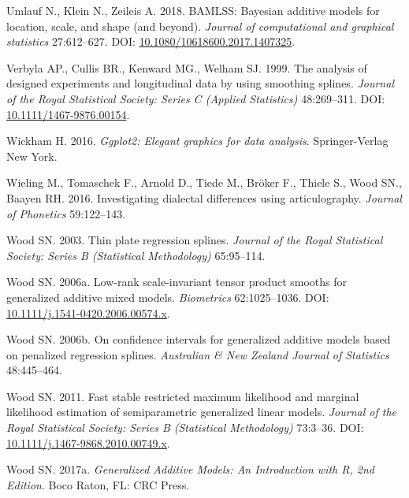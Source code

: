 \documentclass[12pt]{article}
\begin{document}
\hypertarget{ref-umlauf_bamlss_2018}{}
Umlauf N., Klein N., Zeileis A. 2018. BAMLSS: Bayesian additive models
for location, scale, and shape (and beyond). \emph{Journal of
computational and graphical statistics} 27:612--627. DOI:
\href{https://doi.org/10.1080/10618600.2017.1407325}{10.1080/10618600.2017.1407325}.

\hypertarget{ref-verbyla_analysis_2002}{}
Verbyla AP., Cullis BR., Kenward MG., Welham SJ. 1999. The analysis of
designed experiments and longitudinal data by using smoothing splines.
\emph{Journal of the Royal Statistical Society: Series C (Applied
Statistics)} 48:269--311. DOI:
\href{https://doi.org/10.1111/1467-9876.00154}{10.1111/1467-9876.00154}.

\hypertarget{ref-wickham_ggplot2_2016}{}
Wickham H. 2016. \emph{Ggplot2: Elegant graphics for data analysis}.
Springer-Verlag New York.

\hypertarget{ref-wieling_investigating_2016}{}
Wieling M., Tomaschek F., Arnold D., Tiede M., Bröker F., Thiele S.,
Wood SN., Baayen RH. 2016. Investigating dialectal differences using
articulography. \emph{Journal of Phonetics} 59:122--143.

\hypertarget{ref-wood_thin_2003}{}
Wood SN. 2003. Thin plate regression splines. \emph{Journal of the Royal
Statistical Society: Series B (Statistical Methodology)} 65:95--114.

\hypertarget{ref-wood_lowrank_2006}{}
Wood SN. 2006a. Low-rank scale-invariant tensor product smooths for
generalized additive mixed models. \emph{Biometrics} 62:1025--1036. DOI:
\href{https://doi.org/10.1111/j.1541-0420.2006.00574.x}{10.1111/j.1541-0420.2006.00574.x}.

\hypertarget{ref-wood_confidence_2006}{}
Wood SN. 2006b. On confidence intervals for generalized additive models
based on penalized regression splines. \emph{Australian \& New Zealand
Journal of Statistics} 48:445--464.

\hypertarget{ref-wood_fast_2011}{}
Wood SN. 2011. Fast stable restricted maximum likelihood and marginal
likelihood estimation of semiparametric generalized linear models.
\emph{Journal of the Royal Statistical Society: Series B (Statistical
Methodology)} 73:3--36. DOI:
\href{https://doi.org/10.1111/j.1467-9868.2010.00749.x}{10.1111/j.1467-9868.2010.00749.x}.

\hypertarget{ref-wood_generalized_2017}{}
Wood SN. 2017a. \emph{Generalized Additive Models: An Introduction with
R, 2nd Edition}. Boco Raton, FL: CRC Press.
\end{document}
